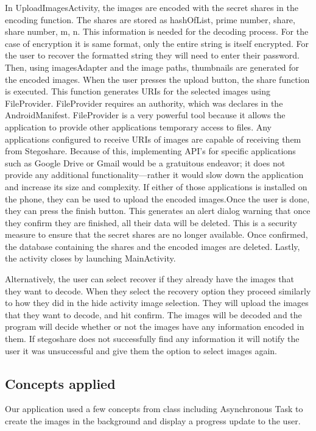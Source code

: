 	In UploadImagesActivity, the images are encoded with the secret shares in the encoding function. The shares are stored as hashOfList, prime number, share, share number, m, n. This information is needed for the decoding process. For the case of encryption it is same format, only the entire string
	is itself encrypted. For the user to recover the formatted string they will need to enter their password. Then, using imagesAdapter and the image paths, thumbnails are generated for the encoded images. When the user presses the upload button, the share function is executed. This function generates URIs for the selected images using FileProvider. FileProvider requires an authority, which was declares in the AndroidManifest.
FileProvider is a very powerful tool because it allows the application to provide other applications temporary access to files. Any applications configured to receive URIs of images are capable of receiving them from Stegoshare. Because of this, implementing API’s for specific applications such as Google Drive or Gmail would be a gratuitous endeavor; it does not provide any additional functionality—rather it would slow down the application and increase its size and complexity.
If either of those applications is installed on the phone, they can be used to upload the encoded images.Once the user is done, they can press the finish button. This generates an alert dialog warning that once they confirm they are finished, all their data will be deleted. This is a security measure to ensure that the secret shares are no longer available. Once confirmed, the database containing the shares and the encoded images are deleted. Lastly, the activity closes by launching MainActivity.

Alternatively, the user can select recover if they already have the images that they want to decode. When they select the recovery option they proceed similarly to how they did in the
hide activity image selection. They will upload the images that they want to decode, and hit confirm. The images will be decoded and the program will decide whether or not the images have any
information encoded in them. If stegoshare does not successfully find any information it will notify the user it was unsuccessful and give them the option to select images again.


\subsection{Concepts applied}
Our application used a few concepts from class including Asynchronous Task to create the images in the background and display a progress update to the user.




